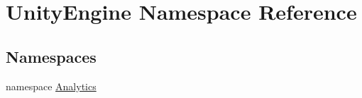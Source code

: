 \hypertarget{namespace_unity_engine}{}\section{Unity\+Engine Namespace Reference}
\label{namespace_unity_engine}
\subsection*{Namespaces}
\begin{DoxyCompactItemize}
\item 
namespace \mbox{\hyperlink{namespace_unity_engine_1_1_analytics}{Analytics}}
\end{DoxyCompactItemize}
